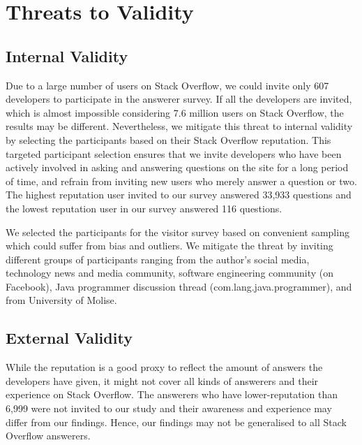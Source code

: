 \documentclass{svjour3}                     %
\begin{document}
\vspace{0.5cm} \noindent{} \vspace{0.5cm}

\section{Threats to Validity}

\subsection{Internal Validity}
Due to a large number of users on Stack Overflow, we could invite only 607
developers to participate in the answerer survey. If all the developers are
invited, which is almost impossible considering 7.6 million users on Stack
Overflow, the results may be different. Nevertheless, we mitigate this threat to
internal validity by selecting the participants based on their Stack Overflow
reputation. This targeted participant selection ensures that we
invite developers who have been actively involved in asking and answering
questions on the site for a long period of time, and refrain from inviting new
users who merely answer a question or two. The highest reputation user invited
to our survey answered 33,933 questions and the lowest reputation user in our
survey answered 116 questions.

We selected the participants for the visitor survey based on convenient sampling
which could suffer from bias and outliers. We mitigate the threat by inviting
different groups of participants ranging from the author's social media,
technology news and media community, software engineering community (on
Facebook), Java programmer discussion thread (com.lang.java.programmer), and
from University of Molise.


\subsection{External Validity} 
While the reputation is a good proxy to reflect the amount of answers the
developers have given, it might not cover all kinds of answerers and their
experience on Stack Overflow. The answerers who have lower-reputation than 6,999
were not invited to our study and their awareness and experience may differ from
our findings. Hence, our findings may not be generalised to all Stack Overflow
answerers.
\end{document}
